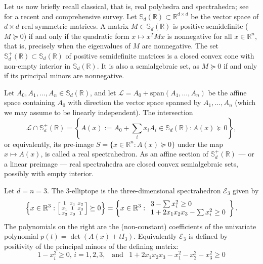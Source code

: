 \documentclass{elsarticle}
\theoremstyle{plain}
\theoremstyle{definition}
\newcommand{\R}{\mathbb{R}} %
\newcommand{\sym}{\mathbb{S}} %
\renewcommand{\span}[1]{{\mathrm{span}(#1)}} %
\newcommand{\calL}{\mathcal{L}} %
\begin{document}
Let us now briefly recall classical, that is, real polyhedra and spectrahedra;
see \cite{netzer2023geometry} for a recent and comprehensive survey.
Let $\sym_d(\R) \subset \R^{d\times d}$ be the vector space of $d \times d$ real symmetric
matrices. A matrix $M \in \sym_d(\R)$ is {positive semidefinite} ($M \succeq 0$) if and only if
 the quadratic form $x \mapsto x^TMx$ is nonnegative for all $x\in \R^n$, that is, precisely when
  the eigenvalues of $M$ are nonnegative. The set $\sym_d^+(\R) \subset \sym_d(\R)$ of positive 
  semidefinite matrices is a closed convex cone with non-empty interior in $\sym_d(\R)$. 
  It is also a semialgebraic set, as $M \succeq 0$ if and only if its principal minors are nonnegative.

Let $A_0,A_1,\ldots,A_n \in \sym_d(\R)$, and let $\calL = A_0+\span{A_1,\ldots,A_n}$ be the affine space
containing $A_0$ with direction the vector space spanned by $A_1,\ldots,A_n$ (which we may assume
to be linearly independent). The intersection
$$
\calL \cap \sym_d^+(\R) = \left\{A(x) := A_0+\sum_i x_i A_i \in \sym_d(\R) :
A(x) \succeq 0\right\},
$$
or equivalently, its pre-image $S = \{x \in \R^n : A(x) \succeq 0\}$ under the map $x \mapsto A(x)$, is called
a {real spectrahedron}. As an affine section of $\sym_d^+(\R)$ --- or a linear preimage --- real spectrahedra
are closed convex semialgebraic sets, possibly with empty interior.

\begin{example}\label{ell3}
  Let $d=n=3$. The $3$-elliptope is the three-di\-men\-sio\-nal spectrahedron
  $\mathcal{E}_3$ given by
  $$
  \left\{
  x
  \in \R^3 :
  \left[
  \begin{smallmatrix}
    1 & x_1 & x_2 \\
    x_1 & 1 & x_3 \\
    x_2 & x_3 & 1
  \end{smallmatrix}
  \right]
  \succeq 0
  \right\}
  =
  \left\{
  x
  \in \R^3 :
  \begin{array}{l}
    {\footnotesize 3-\sum x_i^2 \geq 0} \\
    {\footnotesize 1+2x_1x_2x_3-\sum x_i^2 \geq 0}
  \end{array}
  \right\}.
  $$
  The polynomials on the right are the (non-constant) coefficients of the
  univariate polynomial $p(t) = \det(A(x)+t I_3)$. Equivalently $\mathcal{E}_3$
  is defined by positivity of the principal minors of the defining matrix:
  $$
  1-x_i^2 \geq 0, \, i=1,2,3, \,\,\, \text{ and } \,\,\,
  1+2x_1x_2x_3-x_1^2-x_2^2-x_3^2 \geq 0
  $$
\end{example}
\end{document}
